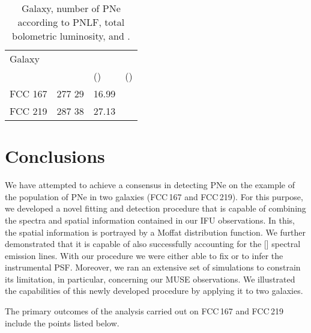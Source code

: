 \documentclass{aa}
\begin{document}
\begin{table}
\renewcommand{\arraystretch}{1.5}
\caption{Galaxy, number of PNe according to PNLF, total bolometric luminosity, and .}
\label{table:alpha}
\begin{tabular}{l l l l}
\hline
Galaxy &  &  &  \\
&  & () & () \\
\hline
FCC 167 & 277  29 & 16.99 &  \\
FCC 219 & 287  38 & 27.13 &  \\
\hline
\end{tabular}

\end{table}


\section{Conclusions}

We have attempted to achieve a consensus in detecting PNe on the example of the population of PNe in two galaxies (FCC\,167 and FCC\,219). For this purpose, we developed a novel fitting and detection procedure that is capable of combining the spectra and spatial information contained in our IFU observations. In this, the spatial information is portrayed by a Moffat distribution function. We further demonstrated that it is capable of also successfully accounting for the [] spectral emission lines. With our procedure we were either able to fix or to infer the instrumental PSF. Moreover, we ran an extensive set of simulations to constrain its limitation, in particular, concerning our MUSE observations. We illustrated the capabilities of this newly developed procedure by applying it to two galaxies.

The primary outcomes of the analysis carried out on FCC\,167 and FCC\,219 include the points listed below.
\end{document}
